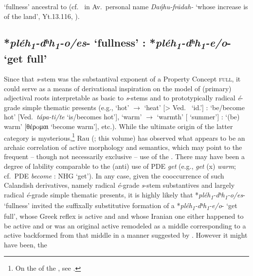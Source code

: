 \documentclass[output=paper,colorlinks,citecolor=brown]{langscibook}
\begin{document}
  ‘fullness’ ancestral to  (cf.\  in Av.\ personal name \textit{Daŋ́hu-frādah-}  ‘whose increase is of the land’, Yt.13.116, \citealt[682]{Bartholomae1904}).

\subsection{*\textit{pléh\textsubscript{1}-dʰh\textsubscript{1}-o/es}- ‘fullness’ : *\textit{pléh\textsubscript{1}-dʰh\textsubscript{1}-e/o}- ‘get full’}

Since that \textit{s}-stem was the substantival exponent of a Property Concept \textsc{full}, it could serve as a means of derivational inspiration on the model of (primary) adjectival roots interpretable as basic to \textit{s}-stems and to prototypically radical \textit{é}-grade simple thematic presents  (e.g.,  ‘hot’ $\rightarrow$  ‘heat’ [> Ved.\  ‘id.’] :  ‘be/become hot’ [Ved.\ \textit{tápa-ti/te}  ‘is/becomes hot’],  ‘warm’ $\rightarrow$  ‘warmth’ [ ‘summer’] :  ‘(be) warm’ [θέρoμαι ‘become warm’], etc.). While the ultimate origin of the latter category is mysterious,\footnote{On the  of the , see \citealt{Jasanoff2023}.} Rau (\citeyear[263--265]{Rau2013}; this volume) has observed what appears to be an archaic correlation of active morphology and  semantics, which may point to the frequent -- though not necessarily exclusive --  use of the . There may have been a degree of lability comparable to the (anti)  use of PDE \textit{get} (e.g., \textit{get} (x) \textit{warm}; cf.\ PDE \textit{become} : NHG  ‘get’). In any case, given the cooccurrence of such Calandish derivatives,  namely radical \textit{é}-grade \textit{s}-stem substantives and largely  radical \textit{é}-grade simple thematic presents, it is highly likely that   *\textit{pléh\textsubscript{1}-dʰh\textsubscript{1}-o/es}- ‘fullness’ invited the suffixally substitutive formation of a *\textit{pléh\textsubscript{1}-dʰh\textsubscript{1}-e/o}- ‘get full’, whose Greek reflex is active and  and whose Iranian one either happened to be active and  or was an original  active remodeled as a middle corresponding to a  active backformed from that middle in a manner suggested by \citet[155]{Rau2009}. However it might have been, the 
\end{document}
